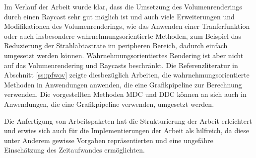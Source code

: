 Im Verlauf der Arbeit wurde klar, dass die Umsetzung des Volumenrenderings durch einen Raycast sehr gut möglich ist und auch viele Erweiterungen und Modifikationen des Volumenrenderings, wie das Anwenden einer Tranferfunktion oder auch insbesondere wahrnehmungsorientierte Methoden, zum Beispiel das Reduzierung der Strahlabtastrate im peripheren Bereich, dadurch einfach umgesetzt werden können.
Wahrnehmungsorientiertes Rendering ist aber nicht auf das Volumenrendering und Raycasts beschränkt.
Die Referenzliteratur in Abschnitt \ref{ss::pfwov} zeigte diesbezüglich Arbeiten, die wahrnehmungsorientierte Methoden in Anwendungen anwenden, die eine Grafikpipeline zur Berechnung verwenden.
Die vorgestellten Methoden MDC und DDC können an sich auch in Anwendungen, die eine Grafikpipeline verwenden, umgesetzt werden.

Die Anfertigung von Arbeitspaketen hat die Strukturierung der Arbeit erleichtert und erwies sich auch für die Implementierungen der Arbeit als hilfreich, da diese unter Anderem gewisse Vorgaben repräsentierten und eine ungefähre Einschätzung des Zeitaufwandes ermöglichten.

